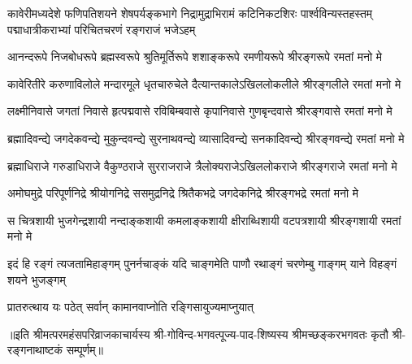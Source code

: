 
{कावेरीमध्यदेशे फणिपतिशयने शेषपर्यङ्कभागे}
{निद्रामुद्राभिरामं कटिनिकटशिरः पार्श्वविन्यस्तहस्तम्}
{पद्माधात्रीकराभ्यां परिचितचरणं रङ्गराजं भजेऽहम्}

\fourlineindentedshloka
{आनन्दरूपे  निजबोधरूपे}
{ब्रह्मस्वरूपे श्रुतिमूर्तिरूपे}
{शशाङ्करूपे रमणीयरूपे}
{श्रीरङ्गरूपे रमतां मनो मे}

\fourlineindentedshloka
{कावेरितीरे करुणाविलोले}
{मन्दारमूले धृतचारुचेले}
{दैत्यान्तकालेऽखिललोकलीले}
{श्रीरङ्गलीले रमतां मनो मे}

\fourlineindentedshloka
{लक्ष्मीनिवासे जगतां निवासे}
{हृत्पद्मवासे रविबिम्बवासे}
{कृपानिवासे गुणबृन्दवासे}
{श्रीरङ्गवासे रमतां मनो मे}


\fourlineindentedshloka
{ब्रह्मादिवन्द्ये जगदेकवन्द्ये}
{मुकुन्दवन्द्ये सुरनाथवन्द्ये}
{व्यासादिवन्द्ये सनकादिवन्द्ये}
{श्रीरङ्गवन्द्ये रमतां मनो मे}

\fourlineindentedshloka
{ब्रह्माधिराजे गरुडाधिराजे}
{वैकुण्ठराजे सुरराजराजे}
{त्रैलोक्यराजेऽखिललोकराजे}
{श्रीरङ्गराजे रमतां मनो मे}

\fourlineindentedshloka
{अमोघमुद्रे परिपूर्णनिद्रे}
{श्रीयोगनिद्रे ससमुद्रनिद्रे}
{श्रितैकभद्रे जगदेकनिद्रे}
{श्रीरङ्गभद्रे रमतां मनो मे}


\fourlineindentedshloka
{स चित्रशायी भुजगेन्द्रशायी}
{नन्दाङ्कशायी कमलाङ्कशायी}
{क्षीराब्धिशायी वटपत्रशायी}
{श्रीरङ्गशायी रमतां मनो मे}


\fourlineindentedshloka
{इदं हि रङ्गं त्यजतामिहाङ्गम्}
{पुनर्नचाङ्कं यदि चाङ्गमेति}
{पाणौ रथाङ्गं चरणेम्बु गाङ्गम्}
{याने विहङ्गं शयने भुजङ्गम्}


{प्रातरुत्थाय यः पठेत्}
{सर्वान् कामानवाप्नोति}
{रङ्गिसायुज्यमाप्नुयात्}

{॥इति श्रीमत्परमहंसपरिव्राजकाचार्यस्य श्री-गोविन्द-भगवत्पूज्य-पाद-शिष्यस्य 
श्रीमच्छङ्करभगवतः कृतौ श्री-रङ्गनाथाष्टकं सम्पूर्णम्॥}